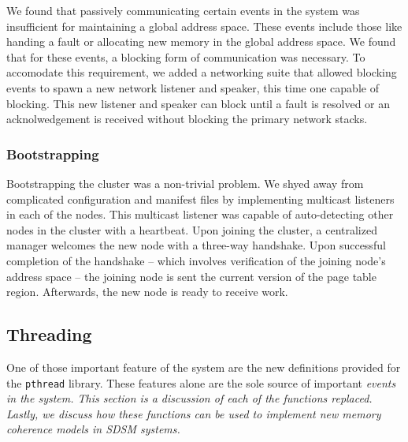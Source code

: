 We found that passively communicating certain events in the system was insufficient for maintaining a global address space.  These events include those like handing a fault or allocating new memory in the global address space.  We found that for these events, a blocking form of communication was necessary.  To accomodate this requirement, we added a networking suite that allowed blocking events to spawn a new network listener and speaker, this time one capable of blocking.  This new listener and speaker can block until a fault is resolved or an acknolwedgement is received without blocking the primary network stacks.

\subsubsection{Bootstrapping}

Bootstrapping the cluster was a non-trivial problem.  We shyed away from complicated configuration and manifest files by implementing multicast listeners in each of the nodes.  This multicast listener was capable of auto-detecting other nodes in the cluster with a heartbeat.  Upon joining the cluster, a centralized manager welcomes the new node with a three-way handshake.  Upon successful completion of the handshake -- which involves verification of the joining node's address space -- the joining node is sent the current version of the page table region.  Afterwards, the new node is ready to receive work.

\subsection{Threading}
One of those important feature of the \projname{} system are the new definitions provided for the \verb,pthread, library.  These features alone are the sole source of important \em events \em in the system.  This section is a discussion of each of the functions replaced.  Lastly, we discuss how these functions can be used to implement new memory coherence models in SDSM systems.

